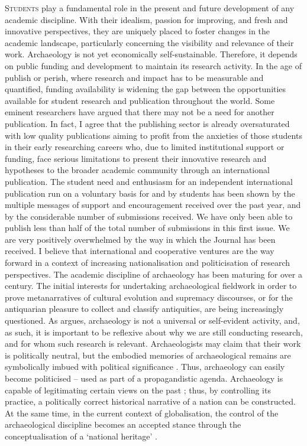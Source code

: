 \lettrine[nindent=0em,lines=3]{S}{tudents} play a fundamental role in the present and future development of any academic discipline. With their idealism, passion for improving, and fresh and innovative perspectives, they are uniquely placed to foster changes in the academic landscape, particularly concerning the visibility and relevance of their work. Archaeology is not yet economically self-sustainable. Therefore, it depends on public funding and development to maintain its research activity. In the age of publish or perish, where research and impact has to be measurable and quantified, funding availability is widening the gap between the opportunities available for student research and publication throughout the world. Some eminent researchers have argued that there may not be a need for another publication. In fact, I agree that the publishing sector is already oversaturated with low quality publications aiming to profit from the anxieties of those students in their early researching careers who, due to limited institutional support or funding, face serious limitations to present their innovative research and hypotheses to the broader academic community through an international publication. The student need and enthusiasm for an independent international publication run on a voluntary basis for and by students has been shown by the multiple messages of support and encouragement received over the past year, and by the considerable number of submissions received. We have only been able to publish less than half of the total number of submissions in this first issue. We are very positively overwhelmed by the way in which the Journal has been received. I believe that international and cooperative ventures are the way forward in a context of increasing nationalisation and politicisation of research perspectives.
		The academic discipline of archaeology has been maturing for over a century. The initial interests for undertaking archaeological fieldwork in order to prove metanarratives of cultural evolution and supremacy discourses, or for the antiquarian pleasure to collect and classify antiquities, are being increasingly questioned. 
        As \textcite{Trigger_2006} argues, archaeology is not a universal or self-evident activity, and, as such, it is important to be reflexive about why we are still conducting research, and for whom such research is relevant. Archaeologists may claim that their work is politically neutral, but the embodied memories of archaeological remains are symbolically imbued with political significance \parencite{Meskell_2012a}. 
        Thus, archaeology can easily become politicised -- used as part of a propagandistic agenda. Archaeology is capable of legitimating certain views on the past \parencite{Alexandri_2002}; thus, by controlling its practice, a politically correct historical narrative of a nation can be constructed. At the same time, in the current context of globalisation, the control of the archaeological discipline becomes an accepted stance through the conceptualisation of a ‘national heritage’ \parencite{Özdogan_1998}. 
